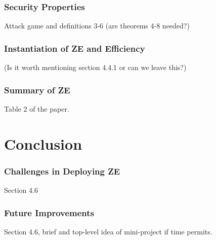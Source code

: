 \documentclass{beamer}
\begin{document}
    \begin{frame}
        \frametitle{Security Properties}
        Attack game and definitions 3-6 (are theorems 4-8 needed?)
    \end{frame}

    \begin{frame}
        \frametitle{Instantiation of ZE and Efficiency}    
        (Is it worth mentioning section 4.4.1 or can we leave this?)
    \end{frame}

    \begin{frame}
        \frametitle{Summary of ZE}
        Table 2 of the paper.
    \end{frame}

    \section{Conclusion}
    \begin{frame}
        \frametitle{Challenges in Deploying ZE}
        Section 4.6
    \end{frame}

    \begin{frame}
        \frametitle{Future Improvements}
        Section 4.6, brief and top-level idea of mini-project if time permits.
    \end{frame}

\end{document}
